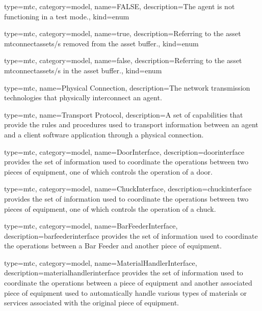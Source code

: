 {
  type=mtc,
  category=model,
  name={FALSE},
  description={The \gls{agent} is not functioning in a test mode.},
  kind={enum}
}

{
  type=mtc,
  category=model,
  name={true},
  description={Referring to the \gls{asset mtconnectassets}/s removed from the \gls{asset buffer}.},
  kind={enum}
}

{
  type=mtc,
  category=model,
  name={false},
  description={Referring to the \gls{asset mtconnectassets}/s in the \gls{asset buffer}.},
  kind={enum}
}

{
  type=mtc,
  name={Physical Connection},
  description={The network transmission technologies that physically interconnect an \gls{agent}.}
}

{
  type=mtc,
  name={Transport Protocol},
  description={A set of capabilities that provide the rules and procedures used to transport information between an \gls{agent} and a client software application through a \gls{physical connection}.}
}

{
  type=mtc,
  category=model,
  name={DoorInterface},
  description={\gls{doorinterface} provides the set of information used to coordinate the operations between two pieces of equipment, one of which controls the operation of a door. }
}


{
  type=mtc,
  category=model,
  name={ChuckInterface},
  description={\gls{chuckinterface} provides the set of information used to coordinate the operations between two pieces of equipment, one of which controls the operation of a chuck.  }
}


{
  type=mtc,
  category=model,
  name={BarFeederInterface},
  description={\gls{barfeederinterface} provides the set of information used to coordinate the operations between a Bar Feeder and another piece of equipment.  }
}


{
  type=mtc,
  category=model,
  name={MaterialHandlerInterface},
  description={\gls{materialhandlerinterface} provides the set of information used to coordinate the operations between a piece of equipment and another associated piece of equipment used to automatically handle various types of materials or services associated with the original piece of equipment. }
}


